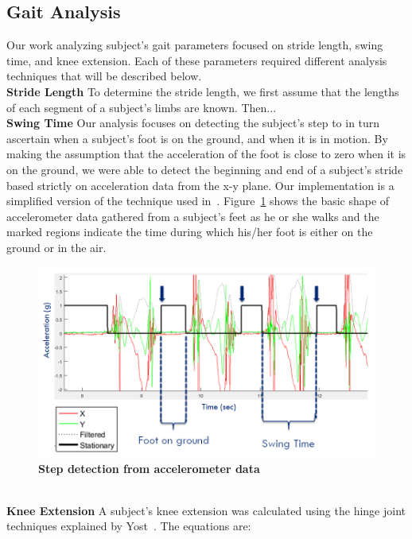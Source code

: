 \documentclass[conference]{IEEEtran}
\begin{document}
\subsection{Gait Analysis}
Our work analyzing subject's gait parameters focused on stride length, swing time, and
knee extension. Each of these parameters required different analysis techniques that will
be described below.\\ 
{\bf Stride Length} To determine the stride length, we first assume that the lengths of each
segment of a subject's limbs are known. Then...\\
{\bf Swing Time} Our analysis focuses on detecting the subject's step to in turn ascertain
when a subject's foot is on the ground, and when it is in motion. By making the assumption
that the acceleration of the foot is close to zero when it is on the ground, we were able
to detect the beginning and end of a subject's stride based strictly on acceleration data
from the x-y plane. Our implementation is a simplified version of the technique used
in~\cite{fancy}. Figure~\ref{fig:step-detect} shows the basic shape of accelerometer data
gathered from a subject's feet as he or she walks and the marked regions indicate the time
during which his/her foot is either on the ground or in the air. 
\begin{figure}[h]
  \centering
  \includegraphics[width=0.8\columnwidth]{figs/swing}
  \caption{{\bf Step detection from accelerometer data}}
  \label{fig:step-detect}
\end{figure}
\\
{\bf Knee Extension} A subject's knee extension was calculated using the hinge joint
techniques explained by Yost~\cite{yost}. The equations are: 
\end{document}

